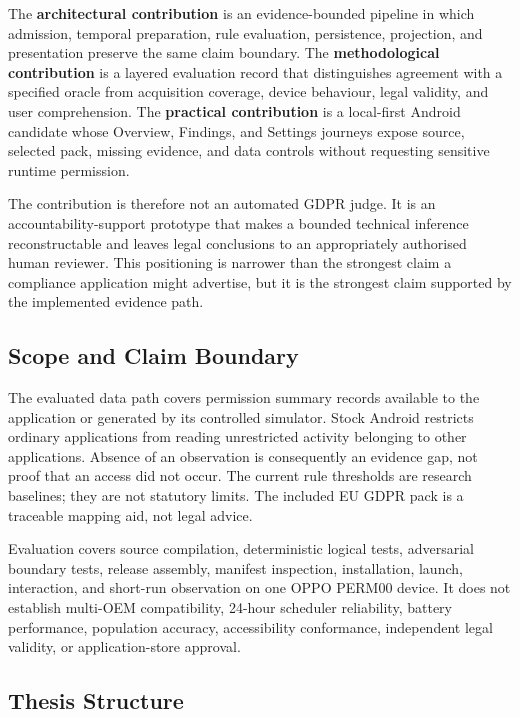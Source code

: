 The \textbf{architectural contribution} is an evidence-bounded pipeline in which admission, temporal preparation, rule evaluation, persistence, projection, and presentation preserve the same claim boundary. The \textbf{methodological contribution} is a layered evaluation record that distinguishes agreement with a specified oracle from acquisition coverage, device behaviour, legal validity, and user comprehension. The \textbf{practical contribution} is a local-first Android candidate whose Overview, Findings, and Settings journeys expose source, selected pack, missing evidence, and data controls without requesting sensitive runtime permission.

The contribution is therefore not an automated GDPR judge. It is an accountability-support prototype that makes a bounded technical inference reconstructable and leaves legal conclusions to an appropriately authorised human reviewer. This positioning is narrower than the strongest claim a compliance application might advertise, but it is the strongest claim supported by the implemented evidence path.

\subsection{Scope and Claim Boundary}

The evaluated data path covers permission summary records available to the application or generated by its controlled simulator. Stock Android restricts ordinary applications from reading unrestricted activity belonging to other applications. Absence of an observation is consequently an evidence gap, not proof that an access did not occur. The current rule thresholds are research baselines; they are not statutory limits. The included EU GDPR pack is a traceable mapping aid, not legal advice.

Evaluation covers source compilation, deterministic logical tests, adversarial boundary tests, release assembly, manifest inspection, installation, launch, interaction, and short-run observation on one OPPO PERM00 device. It does not establish multi-OEM compatibility, 24-hour scheduler reliability, battery performance, population accuracy, accessibility conformance, independent legal validity, or application-store approval.

\subsection{Thesis Structure}

